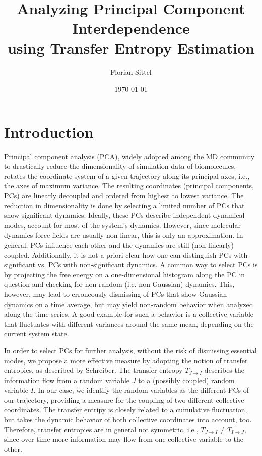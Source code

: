 \documentclass[12pt,a4paper,twoside,english,fleqn,preprint,aps,prb]{revtex4}
\begin{document}
\author{Florian Sittel} 
\title{Analyzing Principal Component Interdependence\\ using Transfer Entropy Estimation}
\date{\today}

\begingroup
 \let\clearpage\relax
 \maketitle
\endgroup

\tableofcontents
\clearpage


\section{Introduction}
Principal component analysis (PCA), widely adopted among the MD community to drastically reduce the dimensionality
of simulation data of biomolecules, rotates the coordinate system of a given trajectory along its principal
axes, i.e., the axes of maximum variance.
The resulting coordinates (principal components, PCs) are linearly decoupled and ordered from highest to lowest variance.
The reduction in dimensionality is done by selecting a limited number of PCs that show significant dynamics.
Ideally, these PCs describe independent dynamical modes, account for most of the system's dynamics.
However, since molecular dynamics force fields are usually non-linear, this is only an approximation.
In general, PCs influence each other and the dynamics are still (non-linearly) coupled.
Additionally, it is not a priori clear how one can distinguish PCs with significant vs. PCs with non-significant dynamics.
A common way to select PCs is by projecting the free energy on a one-dimensional histogram along the PC in question and checking
for non-random (i.e. non-Gaussian) dynamics.
This, however, may lead to erroneously dismissing of PCs that show Gaussian dynamics on a time average, but may yield
non-random behavior when analyzed along the time series.
A good example for such a behavior is a collective variable that fluctuates with different variances around the same mean,
depending on the current system state.

In order to select PCs for further analysis, without the risk of dismissing essential modes, we propose a
more effective measure by adopting the notion of transfer entropies, as described by Schreiber.\cite{Schreiber2000}
The transfer entropy $T_{J \rightarrow I}$ describes the information flow from a random variable $J$ to a (possibly coupled) random variable $I$.
In our case, we identify the random variables as the different PCs of our trajectory, providing a measure for the coupling of two different collective coordinates.
The transfer entripy is closely related to a cumulative fluctuation,
but takes the dynamic behavior of both collective coordinates into account, too.
Therefore, transfer entropies are in general not symmetric, i.e., $T_{J \rightarrow I} \not= T_{I \rightarrow J}$, since over time
more information may flow from one collective variable to the other.
\end{document}
